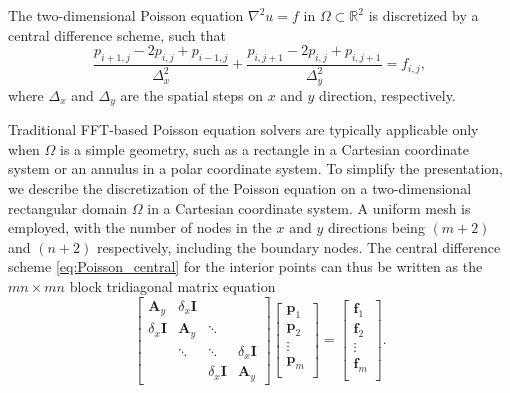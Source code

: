 \documentclass[preprint]{elsarticle}
\begin{document}
The two-dimensional Poisson equation $\nabla^2u=f$ in $\Omega\subset\mathbb{R}^2$ is discretized by a central difference scheme, such that
\begin{equation}
    \label{eq:Poisson_central}
    \dfrac{p_{i+1,j}-2p_{i,j}+p_{i-1,j}}{\Delta_x^2}+\dfrac{p_{i,j+1}-2p_{i,j}+p_{i,j+1}}{\Delta_y^2}=f_{i,j},
\end{equation}
where $\Delta_x$ and $\Delta_y$ are the spatial steps on $x$ and $y$ direction, respectively.

Traditional FFT-based Poisson equation solvers are typically applicable only when $\Omega$ is a simple geometry, such as a rectangle in a Cartesian coordinate system or an annulus in a polar coordinate system. To simplify the presentation, we describe the discretization of the Poisson equation on a two-dimensional rectangular domain $\Omega$ in a Cartesian coordinate system. A uniform mesh is employed, with the number of nodes in the $x$ and $y$ directions being $\left(m+2\right)$ and $\left(n+2\right)$ respectively, including the boundary nodes. The central difference scheme \eqref{eq:Poisson_central} for the interior points can thus be written as the $mn \times mn$ block tridiagonal matrix equation
\begin{equation}
    \label{eq:mat_Poisson}
    \left[\begin{matrix}
        \boldsymbol{A}_y & \delta_x\boldsymbol{I} \\
        \delta_x\boldsymbol{I} & \boldsymbol{A}_y & \ddots\\
        & \ddots & \ddots & \delta_x\boldsymbol{I}\\
        & & \delta_x\boldsymbol{I} & \boldsymbol{A}_y
    \end{matrix}\right]
    \left[\begin{matrix}
        \boldsymbol{p}_{1}\\
        \boldsymbol{p}_{2}\\
        \vdots\\
        \boldsymbol{p}_{m}\\
    \end{matrix}\right]
    =
    \left[\begin{matrix}
        \boldsymbol{f}_{1}\\
        \boldsymbol{f}_{2}\\
        \vdots\\
        \boldsymbol{f}_{m}\\
    \end{matrix}\right].
\end{equation}
\end{document}

